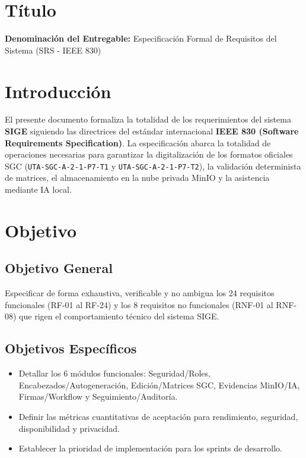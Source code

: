 \documentclass[12pt,a4paper]{article}
\begin{document}
\section{Título}
\textbf{Denominación del Entregable:} Especificación Formal de Requisitos del Sistema (SRS - IEEE 830)



\section{Introducción}
El presente documento formaliza la totalidad de los requerimientos del sistema \textbf{SIGE} siguiendo las directrices del estándar internacional \textbf{IEEE 830 (Software Requirements Specification)}. La especificación abarca la totalidad de operaciones necesarias para garantizar la digitalización de los formatos oficiales SGC (\texttt{UTA-SGC-A-2-1-P7-T1} y \texttt{UTA-SGC-A-2-1-P7-T2}), la validación determinista de matrices, el almacenamiento en la nube privada MinIO y la asistencia mediante IA local.

\section{Objetivo}

\subsection{Objetivo General}
Especificar de forma exhaustiva, verificable y no ambigua los 24 requisitos funcionales (RF-01 al RF-24) y los 8 requisitos no funcionales (RNF-01 al RNF-08) que rigen el comportamiento técnico del sistema SIGE.

\subsection{Objetivos Específicos}
\begin{itemize}[leftmargin=1.5em, itemsep=1.5pt, topsep=1.5pt]
    \item Detallar los 6 módulos funcionales: Seguridad/Roles, Encabezados/Autogeneración, Edición/Matrices SGC, Evidencias MinIO/IA, Firmas/Workflow y Seguimiento/Auditoría.
    \item Definir las métricas cuantitativas de aceptación para rendimiento, seguridad, disponibilidad y privacidad.
    \item Establecer la prioridad de implementación para los sprints de desarrollo.
\end{itemize}
\end{document}
